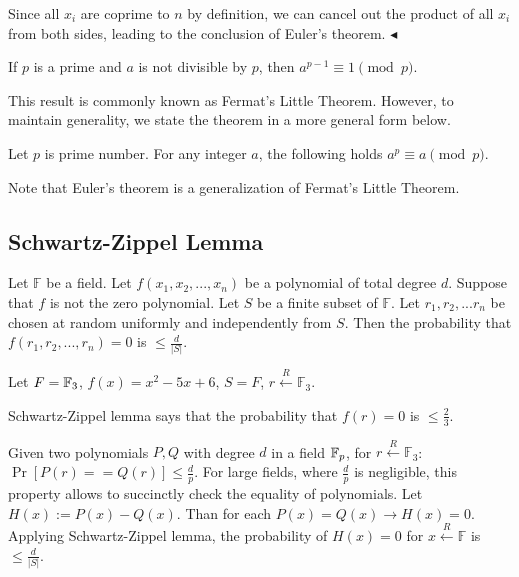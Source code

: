 \documentclass[../lecture-notes-148x210.tex]{subfiles}
\begin{document}
Since all $x_i$ are coprime to $n$ by definition, we can cancel out the product
of all $x_i$ from both sides, leading to the conclusion of Euler's theorem.
$\blacktriangleleft$

\begin{corollary} \label{cor:fermat_little_theorem}
    If $p$ is a prime and $a$ is not divisible by $p$, then $a^{p - 1} \equiv 1 \pmod{p}$.
\end{corollary}
This result is commonly known as Fermat's Little Theorem. However, to maintain generality, 
we state the theorem in a more general form below.

\begin{theorem}  \label{th:fermat_little_theorem}
    Let $p$ is prime number. For any integer $a$, the following holds $a^{p} \equiv a \pmod{p}$.
\end{theorem}

Note that Euler's theorem is a generalization of Fermat's Little Theorem.

\subsection{Schwartz-Zippel Lemma}

\begin{lemma}\label{lemma:sz}
Let $\mathbb{F}$ be a field. Let $f(x_1, x_2, ..., x_n)$ be a polynomial of total degree $d$. Suppose that $f$ is not the zero polynomial. Let $S$ be
a finite subset of $\mathbb{F}$. Let $r_1, r_2, ... r_n$ be chosen at random uniformly and independently from $S$. Then the probability that 
$f(r_1, r_2, ..., r_n) = 0$ is $\le \frac{d}{|S|}$.
\end{lemma}

\begin{example}
Let $F = \mathbb{F}_3$, $f(x) = x^2 - 5x + 6$, $S = F$, $r \xleftarrow{R} \mathbb{F}_3$.

Schwartz-Zippel lemma says that the probability that $f(r) = 0$ is $\le \frac{2}{3}$.
\end{example}

\vspace{-0.5em}

Given two polynomials $P, Q$ with  degree $d$ in a field $\mathbb{F}_p$, for $r \xleftarrow{R} \mathbb{F}_3$: $\Pr[P(r) == Q(r)] \le \frac{d}{p}$.
For large fields, where  $\frac{d}{p}$ is negligible, this property allows to succinctly check the equality of polynomials.
Let $H(x) := P(x) - Q(x)$. Than for each $P(x) = Q(x) \rightarrow H(x) = 0$. Applying Schwartz-Zippel lemma, 
the probability of $H(x) = 0$ for $x \xleftarrow{R} \mathbb{F} $ is $\le \frac{d}{|S|}$.

\newpage
\end{document}

